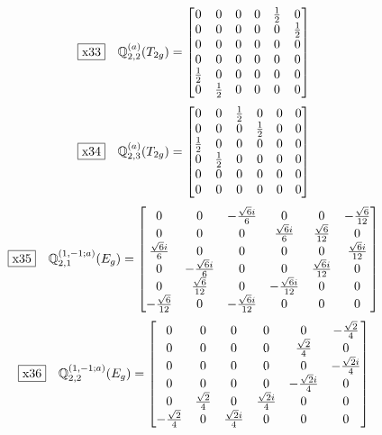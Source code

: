 \documentclass[fleqn,10pt,landscape]{jsarticle}
\begin{document}
\begin{dmath*}
\fbox{x33}\quad \mathbb{Q}_{2,2}^{(a)}(T_{2g})=\begin{bmatrix} 0 & 0 & 0 & 0 & \frac{1}{2} & 0 \\ 0 & 0 & 0 & 0 & 0 & \frac{1}{2} \\ 0 & 0 & 0 & 0 & 0 & 0 \\ 0 & 0 & 0 & 0 & 0 & 0 \\ \frac{1}{2} & 0 & 0 & 0 & 0 & 0 \\ 0 & \frac{1}{2} & 0 & 0 & 0 & 0 \end{bmatrix}
\end{dmath*}
\begin{dmath*}
\fbox{x34}\quad \mathbb{Q}_{2,3}^{(a)}(T_{2g})=\begin{bmatrix} 0 & 0 & \frac{1}{2} & 0 & 0 & 0 \\ 0 & 0 & 0 & \frac{1}{2} & 0 & 0 \\ \frac{1}{2} & 0 & 0 & 0 & 0 & 0 \\ 0 & \frac{1}{2} & 0 & 0 & 0 & 0 \\ 0 & 0 & 0 & 0 & 0 & 0 \\ 0 & 0 & 0 & 0 & 0 & 0 \end{bmatrix}
\end{dmath*}
\begin{dmath*}
\fbox{x35}\quad \mathbb{Q}_{2,1}^{(1,-1;a)}(E_{g})=\begin{bmatrix} 0 & 0 & - \frac{\sqrt{6} i}{6} & 0 & 0 & - \frac{\sqrt{6}}{12} \\ 0 & 0 & 0 & \frac{\sqrt{6} i}{6} & \frac{\sqrt{6}}{12} & 0 \\ \frac{\sqrt{6} i}{6} & 0 & 0 & 0 & 0 & \frac{\sqrt{6} i}{12} \\ 0 & - \frac{\sqrt{6} i}{6} & 0 & 0 & \frac{\sqrt{6} i}{12} & 0 \\ 0 & \frac{\sqrt{6}}{12} & 0 & - \frac{\sqrt{6} i}{12} & 0 & 0 \\ - \frac{\sqrt{6}}{12} & 0 & - \frac{\sqrt{6} i}{12} & 0 & 0 & 0 \end{bmatrix}
\end{dmath*}
\begin{dmath*}
\fbox{x36}\quad \mathbb{Q}_{2,2}^{(1,-1;a)}(E_{g})=\begin{bmatrix} 0 & 0 & 0 & 0 & 0 & - \frac{\sqrt{2}}{4} \\ 0 & 0 & 0 & 0 & \frac{\sqrt{2}}{4} & 0 \\ 0 & 0 & 0 & 0 & 0 & - \frac{\sqrt{2} i}{4} \\ 0 & 0 & 0 & 0 & - \frac{\sqrt{2} i}{4} & 0 \\ 0 & \frac{\sqrt{2}}{4} & 0 & \frac{\sqrt{2} i}{4} & 0 & 0 \\ - \frac{\sqrt{2}}{4} & 0 & \frac{\sqrt{2} i}{4} & 0 & 0 & 0 \end{bmatrix}
\end{dmath*}
\end{document}
